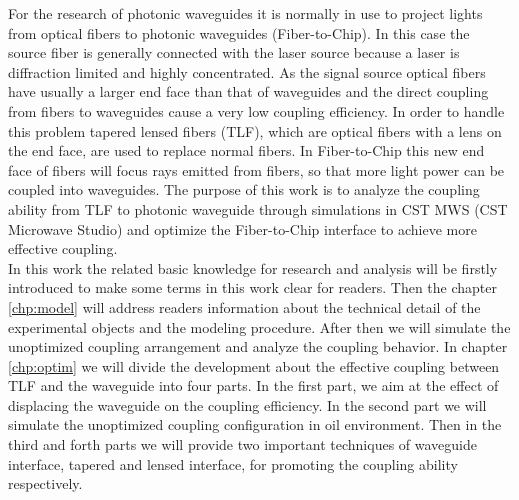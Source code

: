 
For the research of photonic waveguides it is normally in use to project lights from optical fibers to photonic waveguides (Fiber-to-Chip). In this case the source fiber is generally connected with the laser source because a laser is diffraction limited and highly concentrated. As the signal source optical fibers have usually a larger end face than that of waveguides and the direct coupling from fibers to waveguides cause a very low coupling efficiency. In order to handle this problem tapered lensed fibers (TLF), which are optical fibers with a lens on the end face, are used to replace normal fibers. In Fiber-to-Chip  this new end face of fibers will focus rays emitted from fibers, so that more light power can be coupled into waveguides. The purpose of this work is to analyze the coupling ability from TLF to photonic waveguide through simulations in CST MWS  (CST Microwave Studio\textregistered) and optimize the Fiber-to-Chip interface to achieve more effective coupling.\\

In this work the related basic knowledge for research and analysis will be firstly introduced to make some terms in this work clear for readers. Then the chapter \ref{chp:model} will address readers information about the technical detail of the experimental objects and the modeling procedure. After then we will simulate the unoptimized coupling arrangement and analyze the coupling behavior. In chapter \ref{chp:optim} we will divide the development about the effective coupling between TLF and the waveguide  into four parts. In the first part, we aim at the effect of displacing the waveguide on the coupling efficiency. In the second part we will simulate the unoptimized coupling configuration in oil environment. Then in the third and forth parts we will provide two important techniques of waveguide interface, tapered and lensed interface, for promoting the coupling ability respectively.\\  
